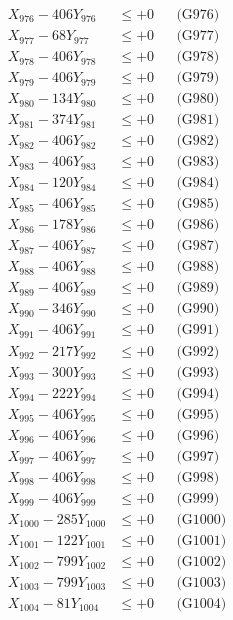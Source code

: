 \documentclass[a4paper,10pt]{article}
\begin{document}
{\begin{align}
X_{976} - 406Y_{976} &\leq +0 && \text{(G976)} \\
X_{977} - 68Y_{977} &\leq +0 && \text{(G977)} \\
X_{978} - 406Y_{978} &\leq +0 && \text{(G978)} \\
X_{979} - 406Y_{979} &\leq +0 && \text{(G979)} \\
X_{980} - 134Y_{980} &\leq +0 && \text{(G980)} \\
\allowbreak
X_{981} - 374Y_{981} &\leq +0 && \text{(G981)} \\
X_{982} - 406Y_{982} &\leq +0 && \text{(G982)} \\
X_{983} - 406Y_{983} &\leq +0 && \text{(G983)} \\
X_{984} - 120Y_{984} &\leq +0 && \text{(G984)} \\
X_{985} - 406Y_{985} &\leq +0 && \text{(G985)} \\
X_{986} - 178Y_{986} &\leq +0 && \text{(G986)} \\
X_{987} - 406Y_{987} &\leq +0 && \text{(G987)} \\
X_{988} - 406Y_{988} &\leq +0 && \text{(G988)} \\
X_{989} - 406Y_{989} &\leq +0 && \text{(G989)} \\
X_{990} - 346Y_{990} &\leq +0 && \text{(G990)} \\
\allowbreak
X_{991} - 406Y_{991} &\leq +0 && \text{(G991)} \\
X_{992} - 217Y_{992} &\leq +0 && \text{(G992)} \\
X_{993} - 300Y_{993} &\leq +0 && \text{(G993)} \\
X_{994} - 222Y_{994} &\leq +0 && \text{(G994)} \\
X_{995} - 406Y_{995} &\leq +0 && \text{(G995)} \\
X_{996} - 406Y_{996} &\leq +0 && \text{(G996)} \\
X_{997} - 406Y_{997} &\leq +0 && \text{(G997)} \\
X_{998} - 406Y_{998} &\leq +0 && \text{(G998)} \\
X_{999} - 406Y_{999} &\leq +0 && \text{(G999)} \\
X_{1000} - 285Y_{1000} &\leq +0 && \text{(G1000)} \\
\allowbreak
X_{1001} - 122Y_{1001} &\leq +0 && \text{(G1001)} \\
X_{1002} - 799Y_{1002} &\leq +0 && \text{(G1002)} \\
X_{1003} - 799Y_{1003} &\leq +0 && \text{(G1003)} \\
X_{1004} - 81Y_{1004} &\leq +0 && \text{(G1004)} \\

\end{align}}
\end{document}
